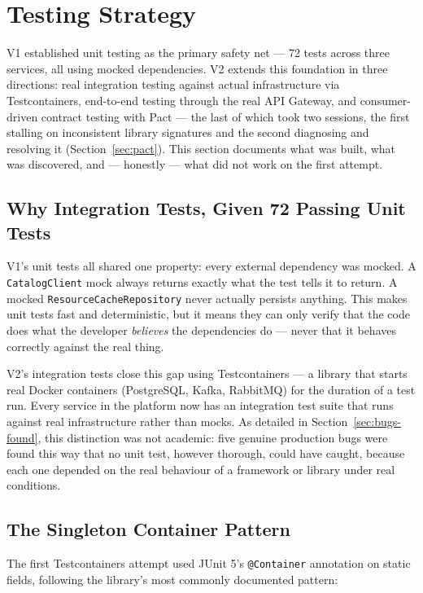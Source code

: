 \section{Testing Strategy}
\label{sec:testing}

V1 established unit testing as the primary safety net --- 72 tests across three services, all using mocked dependencies. V2 extends this foundation in three directions: real integration testing against actual infrastructure via Testcontainers, end-to-end testing through the real API Gateway, and consumer-driven contract testing with Pact --- the last of which took two sessions, the first stalling on inconsistent library signatures and the second diagnosing and resolving it (Section~\ref{sec:pact}). This section documents what was built, what was discovered, and --- honestly --- what did not work on the first attempt.

\subsection{Why Integration Tests, Given 72 Passing Unit Tests}

V1's unit tests all shared one property: every external dependency was mocked. A \texttt{CatalogClient} mock always returns exactly what the test tells it to return. A mocked \texttt{ResourceCacheRepository} never actually persists anything. This makes unit tests fast and deterministic, but it means they can only verify that the code does what the developer \emph{believes} the dependencies do --- never that it behaves correctly against the real thing.

V2's integration tests close this gap using Testcontainers --- a library that starts real Docker containers (PostgreSQL, Kafka, RabbitMQ) for the duration of a test run. Every service in the platform now has an integration test suite that runs against real infrastructure rather than mocks. As detailed in Section~\ref{sec:bugs-found}, this distinction was not academic: five genuine production bugs were found this way that no unit test, however thorough, could have caught, because each one depended on the real behaviour of a framework or library under real conditions.

\subsection{The Singleton Container Pattern}

The first Testcontainers attempt used JUnit 5's \texttt{@Container} annotation on static fields, following the library's most commonly documented pattern:

